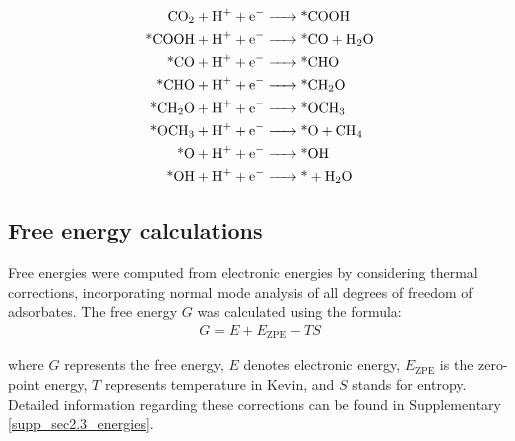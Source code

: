     \begin{align}
    \ce{CO2 + H+ + e-          &-> \text{*}COOH}      \label{main_eq1:co2rr1}    \\
    \ce{\text{*}COOH + H+ + e- &-> \text{*}CO + H2O}  \label{main_eq2:co2rr2}    \\
    \ce{\text{*}CO + H+ + e-   &-> \text{*}CHO}       \label{main_eq3:co2rr3}    \\
    \ce{\text{*}CHO + H+ + e-  &-> \text{*}CH2O}      \label{main_eq4:co2rr4}    \\
    \ce{\text{*}CH2O + H+ + e- &-> \text{*}OCH3}      \label{main_eq5:co2rr5}    \\
    \ce{\text{*}OCH3 + H+ + e- &-> \text{*}O + CH4}   \label{main_eq6:co2rr6}    \\
    \ce{\text{*}O + H+ + e-    &-> \text{*}OH}        \label{main_eq7:co2rr7}    \\
    \ce{\text{*}OH + H+ + e-   &-> \text{*} + H2O}    \label{main_eq8:co2rr8}
    \end{align}


    \subsection{Free energy calculations}
    Free energies were computed from electronic energies by considering thermal corrections, incorporating normal mode analysis of all degrees of freedom of adsorbates.
    The free energy $\textit{G}$ was calculated using the formula:
    \begin{align}
    G = E + E_{\text{ZPE}} - TS  \label{main_eq9:free_energy}
    \end{align}

    where $\textit{G}$ represents the free energy, $\textit{E}$ denotes electronic energy, $\textit{E}_{\text{ZPE}}$ is the zero-point energy, $\textit{T}$ represents temperature in Kevin, and $\textit{S}$ stands for entropy.
    Detailed information regarding these corrections can be found in Supplementary \cref{supp_sec2.3_energies}.

